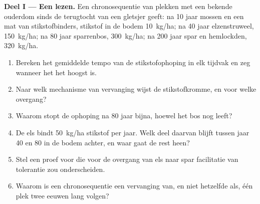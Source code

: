 \begin{problem}
\label{pb:b1:ecosystem-dynamics:1}

\medskip
\noindent\textbf{Deel I --- Een  lezen.}
Een chronosequentie van plekken met een bekende ouderdom sinds de terugtocht
van een gletsjer geeft: na 10 jaar mossen en een mat van stikstofbinders,
stikstof in de bodem \qty{10}{kg/ha}; na 40 jaar elzenstruweel,
\qty{150}{kg/ha}; na 80 jaar sparrenbos, \qty{300}{kg/ha}; na 200 jaar spar
en hemlockden, \qty{320}{kg/ha}.
\begin{enumerate}
  \item Bereken het gemiddelde tempo van de stikstofophoping in elk
        tijdvak en zeg wanneer het het hoogst is.
  \item Naar welk mechanisme van vervanging wijst de stikstofkromme, en
        voor welke overgang?
  \item Waarom stopt de ophoping na 80 jaar bijna, hoewel het bos nog
        leeft?
  \item De els bindt \qty{50}{kg/ha} stikstof per jaar. Welk deel daarvan
        blijft tussen jaar 40 en 80 in de bodem achter, en waar gaat de
        rest heen?
  \item Stel een proef voor die voor de overgang van els naar spar
        facilitatie van tolerantie zou onderscheiden.
  \item Waarom is een chronosequentie een vervanging van, en niet
        hetzelfde als, één plek twee eeuwen lang volgen?
\end{enumerate}


\end{problem}
